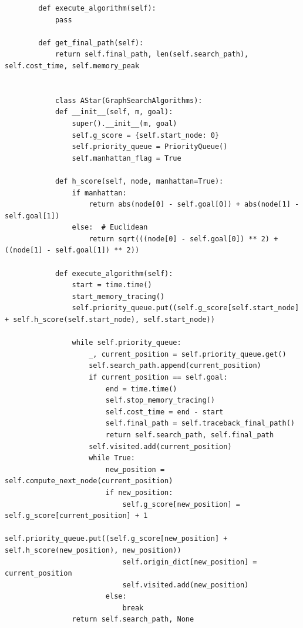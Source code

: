 \documentclass{article}
\begin{document}
\begin{lstlisting}
        def execute_algorithm(self):
            pass
    
        def get_final_path(self):
            return self.final_path, len(self.search_path), self.cost_time, self.memory_peak
    
    
            class AStar(GraphSearchAlgorithms):
            def __init__(self, m, goal):
                super().__init__(m, goal)
                self.g_score = {self.start_node: 0}
                self.priority_queue = PriorityQueue()
                self.manhattan_flag = True
        
            def h_score(self, node, manhattan=True):
                if manhattan:
                    return abs(node[0] - self.goal[0]) + abs(node[1] - self.goal[1])
                else:  # Euclidean
                    return sqrt(((node[0] - self.goal[0]) ** 2) + ((node[1] - self.goal[1]) ** 2))
        
            def execute_algorithm(self):
                start = time.time()
                start_memory_tracing()
                self.priority_queue.put((self.g_score[self.start_node] + self.h_score(self.start_node), self.start_node))
        
                while self.priority_queue:
                    _, current_position = self.priority_queue.get()
                    self.search_path.append(current_position)
                    if current_position == self.goal:
                        end = time.time()
                        self.stop_memory_tracing()
                        self.cost_time = end - start
                        self.final_path = self.traceback_final_path()
                        return self.search_path, self.final_path
                    self.visited.add(current_position)
                    while True:
                        new_position = self.compute_next_node(current_position)
                        if new_position:
                            self.g_score[new_position] = self.g_score[current_position] + 1
                            self.priority_queue.put((self.g_score[new_position] + self.h_score(new_position), new_position))
                            self.origin_dict[new_position] = current_position
                            self.visited.add(new_position)
                        else:
                            break
                return self.search_path, None
\end{lstlisting}
\end{document}
